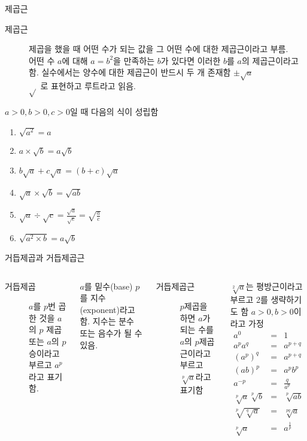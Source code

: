 \documentclass[10pt,t]{beamer}
\begin{document}
\begin{frame}[fragile]{제곱근}
    \begin{description}
        \item[제곱근] 제곱을 했을 때 어떤 수가 되는 값을 그 어떤 수에 대한 제곱근이라고 부름. \\
        어떤 수 $a$에 대해 $a=b^2$을 만족하는 $b$가 있다면 이러한 $b$를 $a$의 제곱근이라고 함. 실수에서는 양수에 대한 제곱근이 반드시 두 개 존재함 $\pm\sqrt{a}$\\
        $\sqrt{}$ 로 표현하고 루트라고 읽음. 
    \end{description}
$a>0, b>0, c>0$일 때 다음의 식이 성립함
    \begin{enumerate}
        \item $\sqrt{a^2} = a$
        \item $a \times \sqrt{b} = a\sqrt{b}$
        \item $b\sqrt{a} + c\sqrt{a} = (b+c)\sqrt{a}$
        \item $\sqrt{a} \times \sqrt{b} = \sqrt{ab}$
        \item $\sqrt{a} \div \sqrt{c} = \frac{\sqrt{a}}{\sqrt{c}} = \sqrt{\frac{a}{c}}$
        \item $\sqrt{a^2 \times b} = a\sqrt{b}$
    \end{enumerate}
\end{frame}



\begin{frame}[fragile]{거듭제곱과 거듭제곱근}
 \begin{columns}
     \begin{description}
         \item[거듭제곱] $a$를 $p$번 곱한 것을 $a$의 $p$ 제곱 또는 $a$의 $p$승이라고 부르고 $a^p$라고 표기함. 
      \end{description}
      $a$를 밑수(base) $p$를 지수(exponent)라고 함. 지수는 분수 또는 음수가 될 수 있음.
      \begin{description}
        \item[거듭제곱근] $p$제곱을 하면 $a$가 되는 수를 $a$의 $p$제곱근이라고 부르고 $\sqrt[p]{a}$라고 표기함
      \end{description}
      $\sqrt[2]{a}$는 평방근이라고 부르고 2를 생략하기도 함
     $a>0, b>0$이라고 가정
     \begin{eqnarray*}
         a^{0} &=& 1\\
         a^p a^q &=& a^{p+q}\\
         (a^p)^q &=& a^{p+q}\\
         (ab)^p &=& a^p b^p\\
         a^{-p} &=& \frac{q}{a^p}\\
         \sqrt[p]{a}\sqrt[p]{b} &=&\sqrt[p]{ab}\\
         \sqrt[p]{\sqrt[q]{a}} &=& \sqrt[pq]{a}\\
         \sqrt[p]{a} &=& a^{\frac{1}{p}}
     \end{eqnarray*}
 \end{columns}
\end{frame}
\end{document}
